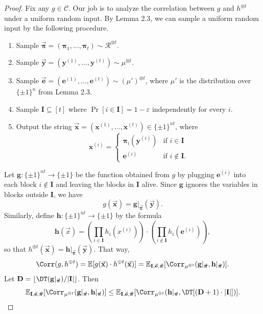 \begin{proof}
Fix any $g\in\mathcal C$. Our job is to analyze the correlation between $g$ and $h^{\oplus t}$ under a uniform random input. By Lemma 2.3, we can sample a uniform random input by the following procedure.
\begin{enumerate}
\item Sample $\vec{\boldsymbol\pi}=(\boldsymbol\pi_1,\ldots,\boldsymbol\pi_t)\sim\mathcal R^{\otimes t}$.
\item Sample $\vec{\mathbf y}=(\mathbf y^{(1)},\ldots,\mathbf y^{(t)})\sim\mu^{\otimes t}$.
\item Sample $\vec{\mathbf e}=(\mathbf e^{(1)},\ldots,\mathbf e^{(t)})\sim(\mu')^{\otimes t}$, where $\mu'$ is the distribution over $\{\pm1\}^n$ from Lemma 2.3.
\item Sample $\mathbf I\subseteq[t]$ where $\Pr[i\in\mathbf I]=1-\varepsilon$ independently for every $i$.
\item Output the string $\vec{\mathbf x}=(\mathbf x^{(1)},\ldots,\mathbf x^{(t)})\in\{\pm1\}^{nt}$, where
\[\mathbf x^{(i)}=\begin{cases}\boldsymbol\pi_i(\mathbf y^{(i)})&\text{if }i\in\mathbf I\\\mathbf e^{(i)}&\text{if }i\notin\mathbf I.\end{cases}\]
\end{enumerate}
Let $\mathbf g:\{\pm1\}^{nt}\to\{\pm1\}$ be the function obtained from $g$ by plugging $\mathbf e^{(i)}$ into each block $i\notin\mathbf I$ and leaving the blocks in $\mathbf I$ alive. Since $\mathbf g$ ignores the variables in blocks outside $\mathbf I$, we have
\[g(\vec{\mathbf x})=\mathbf g|_{\vec{\boldsymbol\pi}}(\vec{\mathbf y}).\]
Similarly, define $\mathbf h:\{\pm1\}^{nt}\to\{\pm1\}$ by the formula
\[\mathbf h(\vec x)=\left(\prod_{i\in\mathbf I}h_i(x^{(i)})\right)\cdot\left(\prod_{i\notin\mathbf I}h_i(\mathbf e^{(i)})\right),\]
so that $h^{\oplus t}(\vec{\mathbf x})=\mathbf h|_{\vec{\boldsymbol\pi}}(\vec{\mathbf y})$. That way,
\[\Corr(g,h^{\oplus t})=\mathbb E[g(\vec{\mathbf x})\cdot h^{\oplus t}(\vec{\mathbf x})]=\mathbb E_{\mathbf I,\vec{\mathbf e},\vec{\boldsymbol\pi}}[\Corr_{\mu^{\otimes t}}(\mathbf g|_{\vec{\boldsymbol\pi}},\mathbf h|_{\vec{\boldsymbol\pi}})].\]
Let $\mathbf D=\lfloor\DT(\mathbf g|_{\vec{\boldsymbol\pi}})/|\mathbf I|\rfloor$. Then
\[\mathbb E_{\mathbf I,\vec{\mathbf e},\vec{\boldsymbol\pi}}[\Corr_{\mu^{\otimes t}}(\mathbf g|_{\vec{\boldsymbol\pi}},\mathbf h|_{\vec{\boldsymbol\pi}})]\le\mathbb E_{\mathbf I,\vec{\mathbf e},\vec{\boldsymbol\pi}}[\Corr_{\mu^{\otimes t}}(\mathbf h|_{\vec{\boldsymbol\pi}},\DT[(\mathbf D+1)\cdot|\mathbf I|])].\]

\end{proof}
